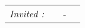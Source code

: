 \begin{titlepage}
\begin{center}
\begin{tabular}{llcl}
      \textit{Invited :}		&  \textsc{}		& - & 
\end{tabular}
\end{center}
\end{titlepage}
\sloppy

\titlepage

